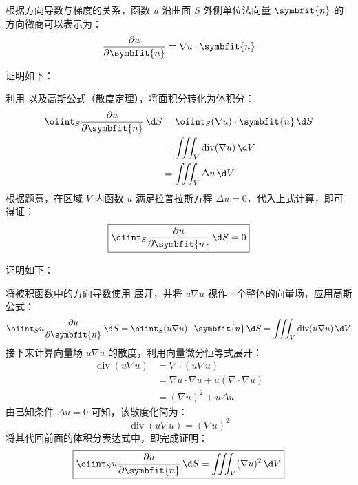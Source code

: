 \begin{myproof}
    根据方向导数与梯度的关系，函数 $u$ 沿曲面 $S$ 外侧单位法向量 $\symbfit{n}$ 的方向微商可以表示为：
    \begin{equation} \label{eq:directional-derivative-1}
        \frac{\partial u}{\partial \symbfit{n}} = \nabla u \cdot \symbfit{n}
    \end{equation}

    证明如下：

    利用  以及高斯公式（散度定理），将面积分转化为体积分：
    \begin{equation}
        \begin{aligned}
            \oiint_S \frac{\partial u}{\partial \symbfit{n}} \, \d S & = \oiint_S (\nabla u) \cdot \symbfit{n} \, \d S \\
                                                                     & = \iiint_V \operatorname{div}(\nabla u) \, \d V \\
                                                                     & = \iiint_V \Delta u \, \d V
        \end{aligned}
    \end{equation}
    根据题意，在区域 $V$ 内函数 $u$ 满足拉普拉斯方程 $\Delta u = 0$．代入上式计算，即可得证：
    \begin{equation}
        \boxed{\oiint_S \frac{\partial u}{\partial \symbfit{n}} \, \d S = 0}
    \end{equation}

    证明如下：

    将被积函数中的方向导数使用  展开，并将 $u \nabla u$ 视作一个整体的向量场，应用高斯公式：
    \begin{equation}
        \oiint_S u \frac{\partial u}{\partial \symbfit{n}} \, \d S = \oiint_S (u \nabla u) \cdot \symbfit{n} \, \d S = \iiint_V \operatorname{div}(u \nabla u) \, \d V
    \end{equation}
    接下来计算向量场 $u \nabla u$ 的散度，利用向量微分恒等式展开：
    \begin{equation}
        \begin{aligned}
            \operatorname{div}(u \nabla u) & = \nabla \cdot (u \nabla u)                           \\
                                           & = \nabla u \cdot \nabla u + u (\nabla \cdot \nabla u) \\
                                           & = (\nabla u)^2 + u \Delta u
        \end{aligned}
    \end{equation}
    由已知条件 $\Delta u = 0$ 可知，该散度化简为：
    \begin{equation}
        \operatorname{div}(u \nabla u) = (\nabla u)^2
    \end{equation}
    将其代回前面的体积分表达式中，即完成证明：
    \begin{equation}
        \boxed{\oiint_S u \frac{\partial u}{\partial \symbfit{n}} \, \d S = \iiint_V (\nabla u)^2 \, \d V}
    \end{equation}
\end{myproof}

\endinput
